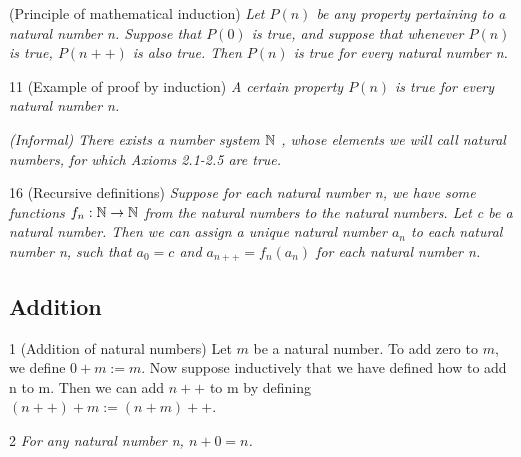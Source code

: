 \begin{axiom}
    \label{ax-induction}
    (Principle of mathematical induction) \emph{Let $P(n)$ be any property pertaining to a natural number n. Suppose that $P(0)$ is true, and suppose that whenever $P(n)$ is true, $P(n++)$ is also true. Then $P(n)$ is true for every natural number n.}
\end{axiom}

\begin{proposition}{11}
    \label{induction-example}
    (Example of proof by induction) \emph{A certain property $P(n)$ is true for every natural number n.}
\end{proposition}

\begin{assumption}
    \label{nat-exists}
    \emph{(Informal) There exists a number system $\mathbb{N}$ , whose elements we will call natural numbers, for which Axioms 2.1-2.5 are true.}
\end{assumption}

\begin{proposition}{16}
    \label{recursive-definitions}
    (Recursive definitions) \emph{Suppose for each natural number n, we have some functions $f_{n}: \mathbb{N} \rightarrow \mathbb{N}$ from the natural numbers to the natural numbers. Let c be a natural number. Then we can assign a unique natural number $a_{n}$ to each natural number n, such that $a_{0} = c$ and $a_{n++} = f_{n}(a_{n})$ for each natural number n.}
\end{proposition}

\subsection{Addition}
\begin{definition}{1}
    \label{nat-addition}
    (Addition of natural numbers) Let $m$ be a natural number. To add zero to $m$, we define $0+m:=m$. Now suppose inductively that we have defined how to add n to m. Then we can add $n++$ to m by defining $(n++)+m := (n+m)++$.
\end{definition}

\begin{lemma}{2}
    \label{nat-add-zero}
    \emph{For any natural number n, $n+0=n$.}
\end{lemma}

